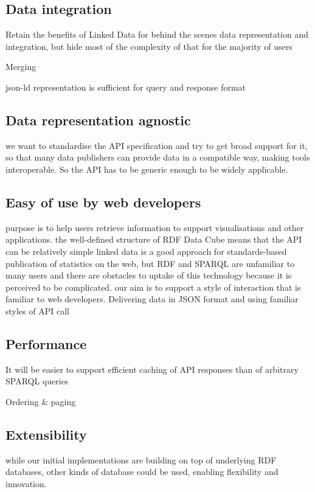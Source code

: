 \documentclass{llncs}
\begin{document}
\subsection{Data integration}

Retain the benefits of Linked Data for behind the scenes data representation and integration, but hide most of the complexity of that for the majority of users

Merging 

json-ld representation is sufficient for query and response format

\subsection{Data representation agnostic}
we want to standardise the API specification and try to get broad support for it, so that many data publishers can provide data in a compatible way, making tools interoperable.  So the API has to be generic enough to be widely applicable.


\subsection{Easy of use by web developers}
purpose is to help users retrieve information to support visualisations and other applications.
the well-defined structure of RDF Data Cube means that the API can be relatively simple
linked data is a good approach for standards-based publication of statistics on the web, but RDF and SPARQL are unfamiliar to many users and there are obstacles to uptake of this technology because it is perceived to be complicated. our aim is to support a style of interaction that is familiar to web developers. Delivering data in JSON format and using familiar styles of API call 


\subsection{Performance}
It will be easier to support efficient caching of API responses than of arbitrary SPARQL queries

Ordering \& paging


\subsection{Extensibility}
while our initial implementations are building on top of underlying RDF databases, other kinds of database could be used, enabling flexibility and innovation. 
\end{document}
